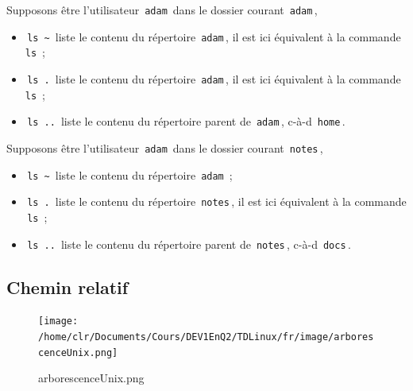 \documentclass[11pt,a4paper]{article}
\begin{document}
          Supposons \^etre l'utilisateur \,\verb|adam|\, dans le dossier courant \,\verb|adam|\,, 
          
					\begin{itemize}
				
			\item \,\verb|ls ~|\, liste le contenu du r\'epertoire \,\verb|adam|\,, 
			        il est ici \'equivalent \`a la commande \,\verb|ls|\,  ;
            
			\item \,\verb|ls .|\, liste le contenu du r\'epertoire \,\verb|adam|\,, 
			        il est ici \'equivalent \`a la commande \,\verb|ls|\,  ;
            
			\item \,\verb|ls ..|\, liste le contenu du r\'epertoire parent de \,\verb|adam|\,, 
			        c-\`a-d \,\verb|home|\,.
            
					\end{itemize}
				
            \par
        
          Supposons \^etre l'utilisateur \,\verb|adam|\, dans le dossier courant \,\verb|notes|\,, 
          
					\begin{itemize}
				
			\item \,\verb|ls ~|\, liste le contenu du r\'epertoire \,\verb|adam|\, ;
            
			\item \,\verb|ls .|\, liste le contenu du r\'epertoire \,\verb|notes|\,, 
			        il est ici \'equivalent \`a la commande \,\verb|ls|\,  ;
            
			\item \,\verb|ls ..|\, liste le contenu du r\'epertoire parent de \,\verb|notes|\,, 
			        c-\`a-d \,\verb|docs|\,.
            
					\end{itemize}
				
            \par
        \subsection{Chemin relatif}\begin{figure}[hbt]
				    \begin{center}
					\texttt{[image: /home/clr/Documents/Cours/DEV1EnQ2/TDLinux/fr/image/arborescenceUnix.png]}
						\end{center}
                
                    \caption[arborescenceUnix.png]{arborescenceUnix.png}
                \end{figure}
                    
\end{document}
